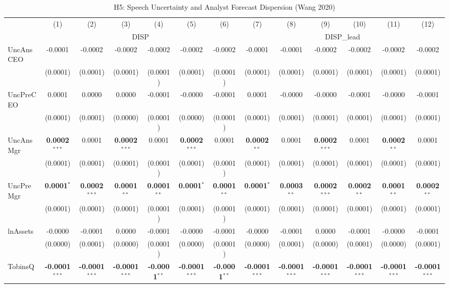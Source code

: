 \documentclass[11pt,a4paper]{article}
\begin{document}
\clearpage
\begin{table}[htbp]
\centering
\caption{H5: Speech Uncertainty and Analyst Forecast Dispersion (Wang 2020)}
\label{tab:h5}
\scriptsize
\begin{tabular}{lcccccccccccc}
\toprule
 & (1) & (2) & (3) & (4) & (5) & (6) & (7) & (8) & (9) & (10) & (11) & (12) \\
 & \multicolumn{6}{c}{DISP} & \multicolumn{6}{c}{DISP\_lead} \\
\cmidrule(lr){2-7} \cmidrule(lr){8-13}
\midrule
UncAnsCEO & -0.0001 & -0.0002 & -0.0002 & -0.0002 & -0.0002 & -0.0002 & -0.0001 & -0.0001 & -0.0002 & -0.0002 & -0.0002 & -0.0002 \\
 & (0.0001) & (0.0001) & (0.0001) & (0.0001) & (0.0001) & (0.0001) & (0.0001) & (0.0001) & (0.0001) & (0.0001) & (0.0001) & (0.0001) \\
UncPreCEO & 0.0001 & 0.0000 & 0.0000 & -0.0001 & -0.0000 & -0.0001 & 0.0001 & -0.0000 & -0.0000 & -0.0001 & -0.0000 & -0.0001 \\
 & (0.0001) & (0.0001) & (0.0000) & (0.0001) & (0.0000) & (0.0001) & (0.0001) & (0.0001) & (0.0001) & (0.0001) & (0.0001) & (0.0001) \\
UncAnsMgr & \textbf{0.0002}$^{***}$ & 0.0001 & \textbf{0.0002}$^{***}$ & 0.0001 & \textbf{0.0002}$^{***}$ & 0.0001 & \textbf{0.0002}$^{**}$ & 0.0001 & \textbf{0.0002}$^{***}$ & 0.0001 & \textbf{0.0002}$^{**}$ & 0.0001 \\
 & (0.0001) & (0.0001) & (0.0001) & (0.0001) & (0.0001) & (0.0001) & (0.0001) & (0.0001) & (0.0001) & (0.0001) & (0.0001) & (0.0001) \\
UncPreMgr & \textbf{0.0001}$^{*}$ & \textbf{0.0002}$^{***}$ & \textbf{0.0001}$^{**}$ & \textbf{0.0001}$^{**}$ & \textbf{0.0001}$^{*}$ & \textbf{0.0001}$^{**}$ & \textbf{0.0001}$^{*}$ & \textbf{0.0003}$^{**}$ & \textbf{0.0002}$^{***}$ & \textbf{0.0002}$^{**}$ & \textbf{0.0001}$^{**}$ & \textbf{0.0002}$^{**}$ \\
 & (0.0001) & (0.0001) & (0.0001) & (0.0001) & (0.0001) & (0.0001) & (0.0001) & (0.0001) & (0.0001) & (0.0001) & (0.0001) & (0.0001) \\
\midrule
lnAssets & -0.0000 & -0.0001 & 0.0000 & -0.0001 & -0.0000 & -0.0001 & -0.0000 & -0.0001 & 0.0000 & -0.0001 & -0.0000 & -0.0001 \\
 & (0.0000) & (0.0001) & (0.0000) & (0.0001) & (0.0000) & (0.0001) & (0.0000) & (0.0001) & (0.0000) & (0.0001) & (0.0000) & (0.0001) \\
TobinsQ & \textbf{-0.0001}$^{***}$ & \textbf{-0.0001}$^{***}$ & \textbf{-0.0001}$^{***}$ & \textbf{-0.0001}$^{**}$ & \textbf{-0.0001}$^{***}$ & \textbf{-0.0001}$^{**}$ & \textbf{-0.0001}$^{***}$ & \textbf{-0.0001}$^{***}$ & \textbf{-0.0001}$^{***}$ & \textbf{-0.0001}$^{***}$ & \textbf{-0.0001}$^{***}$ & \textbf{-0.0001}$^{***}$ \\

\end{tabular}
\end{table}
\end{document}
